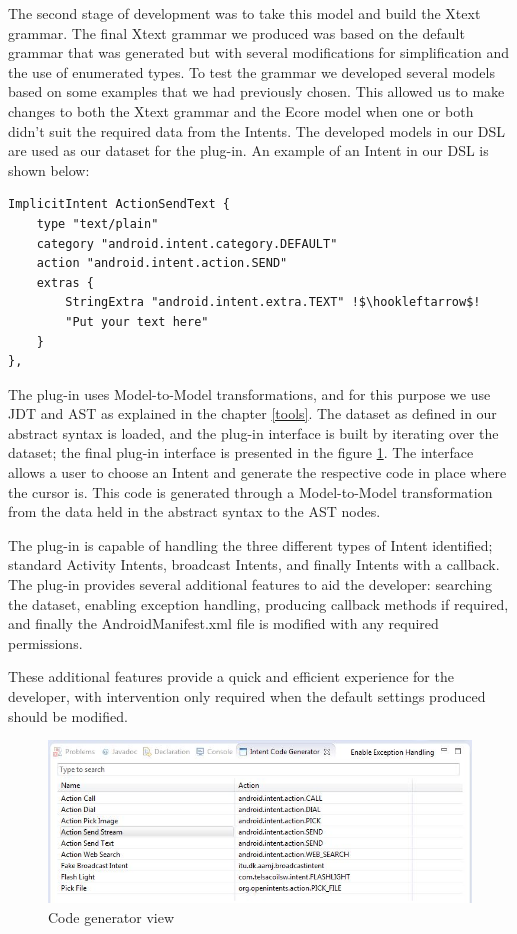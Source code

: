 The second stage of development was to take this model and build the Xtext grammar. The final Xtext grammar we produced was based on the default grammar that was generated but with several modifications for simplification and the use of enumerated types. To test the grammar we developed several models based on some examples that we had previously chosen. This allowed us to make changes to both the Xtext grammar and the Ecore model when one or both didn't suit the required data from the Intents. The developed models in our DSL are used as our dataset for the plug-in. An example of an Intent in our DSL is shown below:

{\footnotesize\begin{lstlisting}[escapechar=!]
ImplicitIntent ActionSendText {
	type "text/plain"
	category "android.intent.category.DEFAULT"
	action "android.intent.action.SEND"
	extras {
		StringExtra "android.intent.extra.TEXT" !$\hookleftarrow$!
		"Put your text here"
	}
},
\end{lstlisting}}

The plug-in uses Model-to-Model transformations, and for this purpose we use JDT and AST as explained in the chapter \ref{tools}. The dataset as defined in our abstract syntax is loaded, and the plug-in interface is built by iterating over the dataset; the final plug-in interface is presented in the figure \ref{codegeneratorview}. The interface allows a user to choose an Intent and generate the respective code in place where the cursor is. This code is generated through a Model-to-Model transformation from the data held in the abstract syntax to the AST nodes.

The plug-in is capable of handling the three different types of Intent identified; standard Activity Intents, broadcast Intents, and finally Intents with a callback. The plug-in provides several additional features to aid the developer: searching the dataset, enabling exception handling, producing callback methods if required, and finally the AndroidManifest.xml file is modified with any required permissions.

These additional features provide a quick and efficient experience for the developer, with intervention only required when the default settings produced should be modified.

\begin{figure}[H]
\label{codegeneratorview}
  \centering
    \includegraphics[width=\textwidth]{codegenerator}
  \caption{Code generator view}
\end{figure}

